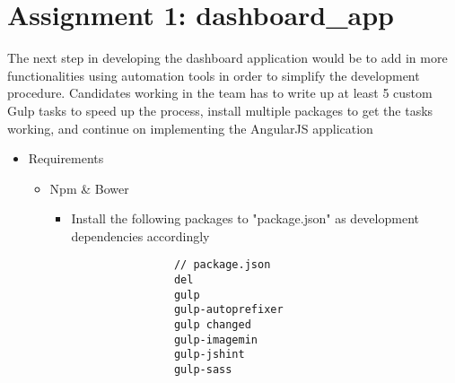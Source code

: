 \documentclass[12pt]{article}
\begin{document}
\section{Assignment 1: dashboard\_app}
The next step in developing the dashboard application would be to add in more functionalities using automation tools in order to simplify the development procedure. Candidates working in the team has to write up at least 5 custom Gulp tasks to speed up the process, install multiple packages to get the tasks working, and continue on implementing the AngularJS application
\begin{itemize}
	\item Requirements	
		\begin{itemize}
		\item Npm \& Bower
			\begin{itemize}
				\item Install the following packages to "package.json" as development dependencies accordingly
				\begin{verbatim}
				// package.json
				del
				gulp
				gulp-autoprefixer
				gulp changed
				gulp-imagemin
				gulp-jshint
				gulp-sass
				

\end{verbatim}
\end{itemize}
\end{itemize}
\end{itemize}
\end{document}
